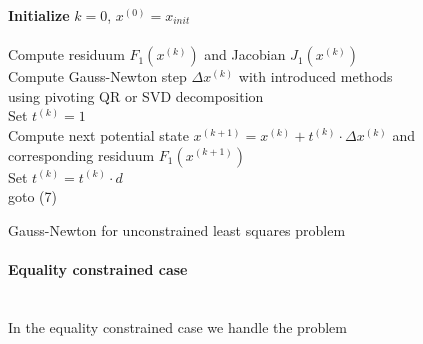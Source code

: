 \documentclass{scrartcl}[12pt, halfparskip]
\numberwithin{equation}{section}
\numberwithin{figure}{section}
\numberwithin{table}{section}
\begin{document}
\begin{algorithm}[H]
	
	
	
	\textbf{Initialize} $k=0$, $x^{(0)} = x_{init}$ \\\mbox{}\\
	
	Compute residuum $F_1(x^{(k)})$ and Jacobian $J_1(x^{(k)})$ \\
	Compute Gauss-Newton step $\Delta x^{(k)}$ with introduced methods \\
	\quad using pivoting QR or SVD decomposition \\
	Set $t^{(k)} = 1$ \\
	Compute next potential state $x^{(k+1)} = x^{(k)} + t^{(k)} \cdot \Delta x^{(k)}$ and \\ \quad corresponding residuum $F_1(x^{(k+1)})$ \\
	
	{Set $t^{(k)} = t^{(k)} \cdot d$ \\
		goto (7)}

	\caption{Gauss-Newton for unconstrained least squares problem}
	\label{alg:Gauss_Newton_unconstrained}
\end{algorithm}

\vspace{0.5cm}
\paragraph{Equality constrained case}\mbox{}\\
In the equality constrained case we handle the problem
\end{document}

